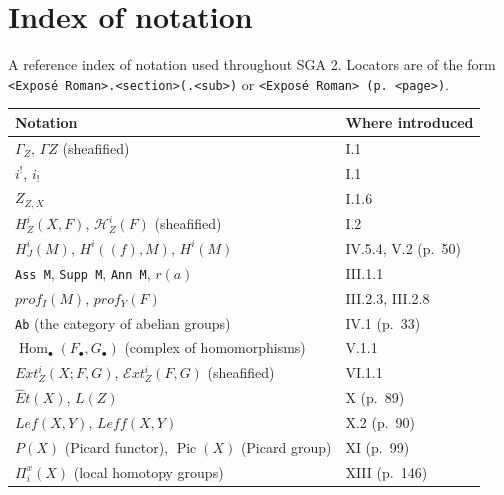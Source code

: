 \documentclass[
  11pt,
  a4paper,
]{book}
\newcounter{none} %
\begin{document}
\chapter{Index of notation}\label{index-of-notation}

A reference index of notation used throughout SGA 2. Locators are of the
form
\texttt{\textless{}Exposé\ Roman\textgreater{}.\textless{}section\textgreater{}(.\textless{}sub\textgreater{})}
or
\texttt{\textless{}Exposé\ Roman\textgreater{}\ (p.\ \textless{}page\textgreater{})}.

{\def\LTcaptype{none} %
\begin{longtable}[]{@{}
  >{\raggedright\arraybackslash}p{}
  >{\raggedright\arraybackslash}p{}@{}}
\toprule\noalign{}
\begin{minipage}[b]{\linewidth}\raggedright
Notation
\end{minipage} & \begin{minipage}[b]{\linewidth}\raggedright
Where introduced
\end{minipage} \\
\midrule\noalign{}
\endhead
\bottomrule\noalign{}
\endlastfoot
\(\Gamma_{Z}\), \(\Gamma Z\) (sheafified) & I.1 \\
\(i^{!}\), \(i_{!}\) & I.1 \\
\(Z_{Z,X}\) & I.1.6 \\
\(H^{i}_{Z}(X, F)\), \(\mathcal{H}^{i}_{Z}(F)\) (sheafified) & I.2 \\
\(H^{i}_{J}(M)\), \(H^{i}((f), M)\), \(H^{i}(M)\) & IV.5.4, V.2
(p.~50) \\
\texttt{Ass\ M}, \texttt{Supp\ M}, \texttt{Ann\ M}, \(r(a)\) &
III.1.1 \\
\(prof_{I}(M)\), \(prof_{Y}(F)\) & III.2.3, III.2.8 \\
\texttt{Ab} (the category of abelian groups) & IV.1 (p.~33) \\
\(\operatorname{Hom}_{\bullet}(F_{\bullet}, G_{\bullet})\) (complex of
homomorphisms) & V.1.1 \\
\(Ext^{i}_{Z}(X; F, G)\), \(\mathcal{E}xt^{i}_{Z}(F, G)\) (sheafified) &
VI.1.1 \\
\(\hat{E}t(X)\), \(L(Z)\) & X (p.~89) \\
\(Lef(X, Y)\), \(Leff(X, Y)\) & X.2 (p.~90) \\
\(P(X)\) (Picard functor), \(\operatorname{Pic}(X)\) (Picard group) & XI
(p.~99) \\
\(\Pi^{x}_{i}(X)\) (local homotopy groups) & XIII (p.~146) \\

\end{longtable}}
\end{document}
